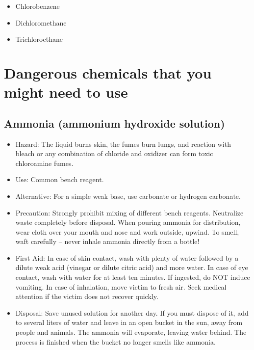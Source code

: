 \begin{itemize}

\item{Chlorobenzene}

\item{Dichloromethane}

\item{Trichloroethane}

\end{itemize}

\section{Dangerous chemicals that you might need to use}

\subsection{Ammonia (ammonium hydroxide solution)}

\begin{itemize}

\item{Hazard: The liquid burns skin, the fumes burn lungs, 
and reaction with bleach or any combination of chloride and oxidizer 
can form toxic chloroamine fumes.}

\item{Use: Common bench reagent.}

\item{Alternative: For a simple weak base, 
use carbonate or hydrogen carbonate.}

\item{Precaution: Strongly prohibit mixing of different bench reagents. 
Neutralize waste completely before disposal. 
When pouring ammonia for distribution, 
wear cloth over your mouth and nose and work outside, upwind. 
To smell, waft carefully – never inhale ammonia directly from a bottle!}

\item{First Aid: In case of skin contact, 
wash with plenty of water followed by a dilute weak acid 
(vinegar or dilute citric acid) and more water. 
In case of eye contact, wash with water for at least ten minutes. 
If ingested, do NOT induce vomiting. 
In case of inhalation, move victim to fresh air. 
Seek medical attention if the victim does not recover quickly.}

\item{Disposal: Save unused solution for another day. 
If you must dispose of it, add to several liters of water 
and leave in an open bucket in the sun, 
away from people and animals. 
The ammonia will evaporate, leaving water behind. 
The process is finished when the bucket no longer smells like ammonia.}

\end{itemize}

